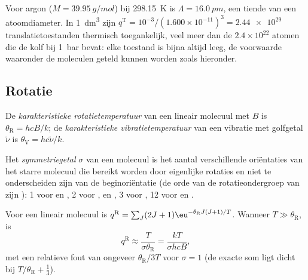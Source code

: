 \begin{example}\label{ex:b3:partition-functions:argon}
Voor argon ($M = \qty{39.95}{g/mol}$) bij \qty{298.15}{K} is $\Lambda = \qty{16.0}{pm}$,
een tiende van een atoomdiameter. In \qty{1}{dm^3} zijn $q^{\mathrm T} = 10^{-3}/(1.600\times10^{-11})^3 = \num{2.44e29}$
translatietoestanden thermisch toegankelijk, veel meer dan de
$2.4\times10^{22}$ atomen die de kolf bij \qty{1}{bar} bevat: elke toestand
is bijna altijd leeg, de voorwaarde waaronder de moleculen geteld kunnen
worden zoals hieronder.
\end{example}

\subsection*{Rotatie}

\begin{definition}\label{def:b3:partition-functions:characteristic-temperature}
De \emph{karakteristieke rotatietemperatuur}
van een lineair molecuul met  $B$ is $\theta_{\mathrm R} =
hcB/k$; de \emph{karakteristieke vibratietemperatuur}
van een vibratie met golfgetal $\tilde\nu$ is $\theta_{\mathrm V} =
hc\tilde\nu/k$.
\end{definition}

\begin{definition}[Symmetriegetal]\label{def:b3:partition-functions:symmetry-number}
Het \emph{symmetriegetal} $\sigma$ van een molecuul is
het aantal verschillende oriëntaties van het starre molecuul die bereikt
worden door eigenlijke rotaties en niet te onderscheiden zijn van de
beginoriëntatie (de orde van de rotatieondergroep van zijn ): 1
voor  en , 2 voor ,
 en , 3 voor , 12 voor  en .
\end{definition}

\begin{proposition}[Rotatietoestandssom]\label{prop:b3:partition-functions:q-rot}
Voor een lineair molecuul is $q^{\mathrm R} = \sum_J(2J+1)\eu^{-\theta_{\mathrm R}J(J+1)/T}$. Wanneer $T \gg
\theta_{\mathrm R}$, is
\[
  q^{\mathrm R} \approx \frac{T}{\sigma\theta_{\mathrm R}} = \frac{kT}{\sigma hcB},
\]
met een relatieve fout van ongeveer $\theta_{\mathrm R}/3T$ voor $\sigma = 1$
(de exacte som ligt dicht bij $T/\theta_{\mathrm R} + \frac13$).
\end{proposition}

